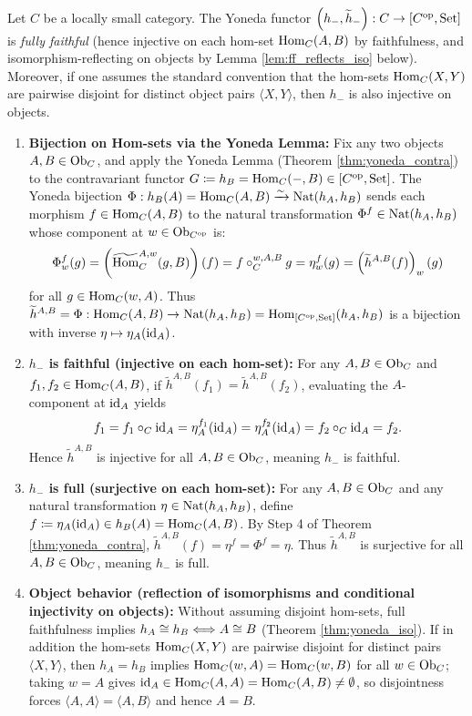 \documentclass[10pt,a4paper]{article}
\begin{document}
\begin{theorem}\label{thm:yoneda_emb}
Let $C$ be a locally small category. The Yoneda functor $\left(h_-, \widetilde{h}_-\right) : C \to [C^{\textrm{op}}, {\textrm{Set}}]$ is \emph{fully faithful} (hence injective on each hom-set ${\textrm{Hom}}_C(A, B)$ by faithfulness, and isomorphism-reflecting on objects by Lemma \ref{lem:ff_reflects_iso} below). Moreover, if one assumes the standard convention that the hom-sets ${\textrm{Hom}}_C(X, Y)$ are pairwise disjoint for distinct object pairs $\langle X, Y \rangle$, then $h_-$ is also injective on objects.
\end{theorem}
\myprf
\begin{enumerate}
\item \textbf{Bijection on Hom-sets via the Yoneda Lemma:}
Fix any two objects $A, B \in {\textrm{Ob}}_C$, and apply the Yoneda Lemma (Theorem \ref{thm:yoneda_contra}) to the contravariant functor $G \coloneqq h_B = {\textrm{Hom}}_C(-,B) \in [C^{\textrm{op}}, {\textrm{Set}}]$.
The Yoneda bijection $\Phi : h_B(A) = {\textrm{Hom}}_C(A,B) \xrightarrow{\sim} {\textrm{Nat}}(h_A, h_B)$ sends each morphism $f \in {\textrm{Hom}}_C(A,B)$ to the natural transformation $\Phi^f \in {\textrm{Nat}}(h_A, h_B)$ whose component at $w \in {\textrm{Ob}}_{C^{\textrm{op}}}$ is:
$$\Phi^f_w(g) = \left({\widetilde{{\textrm{Hom}}}\textrm{}}_C^{A,w}(g, B)\right)(f) = f \circ_C^{w,A,B} g = \eta^f_w(g) = \left(\widetilde{h}^{A,B}(f)\right)_w(g)$$
for all $g \in {\textrm{Hom}}_C(w,A)$. Thus $\widetilde{h}^{A,B} = \Phi : {\textrm{Hom}}_C(A,B) \to {\textrm{Nat}}(h_A, h_B) = {\textrm{Hom}}_{[C^{\textrm{op}},{\textrm{Set}}]}(h_A, h_B)$ is a bijection with inverse $\eta \mapsto \eta_A({\textrm{id}}_A)$.

\item \textbf{$h_-$ is faithful (injective on each hom-set):}
For any $A, B \in {\textrm{Ob}}_C$ and $f_1, f_2 \in {\textrm{Hom}}_C(A,B)$, if $\widetilde{h}^{A,B}(f_1) = \widetilde{h}^{A,B}(f_2)$, evaluating the $A$-component at ${\textrm{id}}_A$ yields
$$f_1 = f_1 \circ_C {\textrm{id}}_A = \eta^{f_1}_A({\textrm{id}}_A) = \eta^{f_2}_A({\textrm{id}}_A) = f_2 \circ_C {\textrm{id}}_A = f_2.$$
Hence $\widetilde{h}^{A,B}$ is injective for all $A,B \in {\textrm{Ob}}_C$, meaning $h_-$ is faithful.

\item \textbf{$h_-$ is full (surjective on each hom-set):}
For any $A, B \in {\textrm{Ob}}_C$ and any natural transformation $\eta \in {\textrm{Nat}}(h_A, h_B)$, define $f \coloneqq \eta_A({\textrm{id}}_A) \in h_B(A) = {\textrm{Hom}}_C(A,B)$. By Step 4 of Theorem \ref{thm:yoneda_contra}, $\widetilde{h}^{A,B}(f) = \eta^f = \Phi^f = \eta$. Thus $\widetilde{h}^{A,B}$ is surjective for all $A,B \in {\textrm{Ob}}_C$, meaning $h_-$ is full.

\item \textbf{Object behavior (reflection of isomorphisms and conditional injectivity on objects):}
Without assuming disjoint hom-sets, full faithfulness implies $h_A \cong h_B \Longleftrightarrow A \cong B$ (Theorem \ref{thm:yoneda_iso}). If in addition the hom-sets ${\textrm{Hom}}_C(X,Y)$ are pairwise disjoint for distinct pairs $\langle X, Y \rangle$, then $h_A = h_B$ implies ${\textrm{Hom}}_C(w,A) = {\textrm{Hom}}_C(w,B)$ for all $w \in {\textrm{Ob}}_C$; taking $w = A$ gives ${\textrm{id}}_A \in {\textrm{Hom}}_C(A,A) = {\textrm{Hom}}_C(A,B) \neq \emptyset$, so disjointness forces $\langle A, A \rangle = \langle A, B \rangle$ and hence $A = B$.
\end{enumerate}
\myqed
\end{document}
